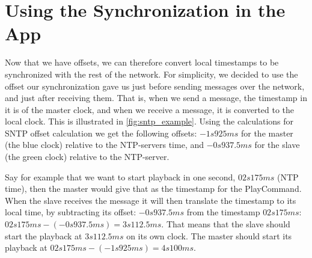 \section{Using the Synchronization in the App}
Now that we have offsets, we can therefore convert local timestamps to be synchronized with the rest of the network.
For simplicity, we decided to use the offset our synchronization gave us just before sending messages over the network, and just after receiving them.
That is, when we send a message, the timestamp in it is of the master clock, and when we receive a message, it is converted to the local clock.
This is illustrated in \ref{fig:sntp_example}.
Using the calculations for \ac{SNTP} offset calculation we get the following offsets:
$-1s925ms$ for the master (the blue clock) relative to the \ac{NTP}-servers time, and
$-0s937.5ms$ for the slave (the green clock) relative to the \ac{NTP}-server.

Say for example that we want to start playback in one second, $02s175ms$ (\ac{NTP} time), then the master would give that as the timestamp for the PlayCommand.
When the slave receives the message it will then translate the timestamp to its local time, by subtracting its offset:
$-0s937.5ms$ from the timestamp $02s175ms$: $02s175ms - (-0s937.5ms) = 3s112.5ms$.
That means that the slave should start the playback at $3s112.5ms$ on its own clock.
The master should start its playback at $02s175ms - (-1s925ms) = 4s100ms.$

